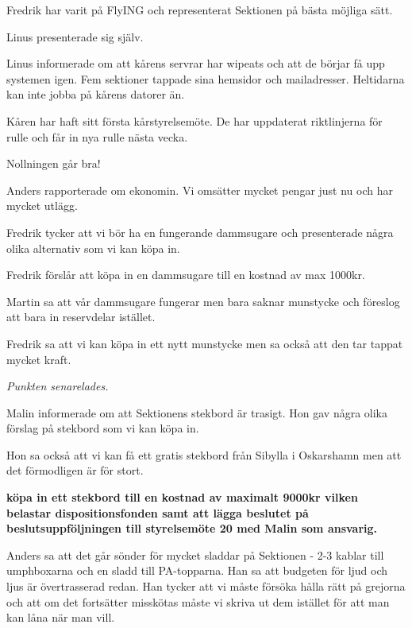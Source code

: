 \documentclass[10pt]{article}
\begin{document}
\begin{paragrafer}
\begin{paragrafer}
Fredrik har varit på FlyING och representerat Sektionen på bästa möjliga sätt.

Linus presenterade sig själv.

Linus informerade om att kårens servrar har wipeats och att de börjar få upp systemen igen. Fem sektioner tappade sina hemsidor och mailadresser. Heltidarna kan inte jobba på kårens datorer än.

Kåren har haft sitt första kårstyrelsemöte. De har uppdaterat riktlinjerna för rulle och får in nya rulle nästa vecka.

Nollningen går bra!

Anders rapporterade om ekonomin. Vi omsätter mycket pengar just nu och har mycket utlägg.

\end{paragrafer}

Fredrik tycker att vi bör ha en fungerande dammsugare och presenterade några olika alternativ som vi kan köpa in.

Fredrik förslår att köpa in en dammsugare till en kostnad av max 1000kr.

Martin sa att vår dammsugare fungerar men bara saknar munstycke och föreslog att bara in reservdelar istället.

Fredrik sa att vi kan köpa in ett nytt munstycke men sa också att den tar tappat mycket kraft.

\emph{Punkten senarelades.}

Malin informerade om att Sektionens stekbord är trasigt. Hon gav några olika förslag på stekbord som vi kan köpa in.

Hon sa också att vi kan få ett gratis stekbord från Sibylla i Oskarshamn men att det förmodligen är för stort.

\textbf{\Mba köpa in ett stekbord till en kostnad av maximalt 9000kr vilken belastar dispositionsfonden samt att lägga beslutet på beslutsuppföljningen till styrelsemöte 20 med Malin som ansvarig.}

Anders sa att det går sönder för mycket sladdar på Sektionen - 2-3 kablar till umphboxarna och en sladd till PA-topparna. Han sa att budgeten för ljud och ljus är övertrasserad redan. Han tycker att vi måste försöka hålla rätt på grejorna och att om det fortsätter misskötas måste vi skriva ut dem istället för att man kan låna när man vill.


\end{paragrafer}
\end{document}
